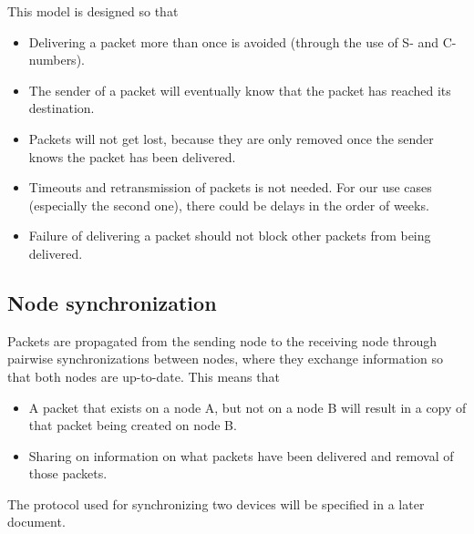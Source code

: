 \documentclass{article}
\begin{document}
This model is designed so that
\begin{itemize}
  \item Delivering a packet more than once is avoided (through the use of S- and C-numbers).
  \item The sender of a packet will eventually know that the packet has reached its destination.
  \item Packets will not get lost, because they are only removed once the sender knows the packet has been delivered.
  \item Timeouts and retransmission of packets is not needed. For our use cases (especially the second one), there could be delays in the order of weeks.
  \item Failure of delivering a packet should not block other packets from being delivered.
\end{itemize}

\subsection{Node synchronization}
Packets are propagated from the sending node to the receiving node through pairwise synchronizations between nodes, where they exchange information so that both nodes are up-to-date. This means that
\begin{itemize}
  \item A packet that exists on a node A, but not on a node B will result in a copy of that packet being created on node B.
  \item Sharing on information on what packets have been delivered and removal of those packets.
\end{itemize}
The protocol used for synchronizing two devices will be specified in a later document.
\end{document}
